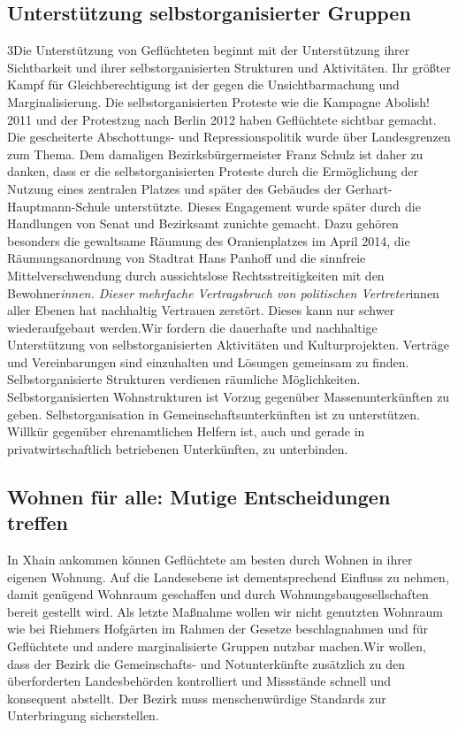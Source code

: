 \documentclass[a4paper,10pt]{article}
\begin{document}
\subsection*{\ttfamily Unterstützung selbstorganisierter
Gruppen}\label{unterstuxfctzung-selbstorganisierter-gruppen}

3Die Unterstützung von Geflüchteten beginnt mit der Unterstützung ihrer
Sichtbarkeit und ihrer selbstorganisierten Strukturen und Aktivitäten.
Ihr größter Kampf für Gleichberechtigung ist der gegen die
Unsichtbarmachung und Marginalisierung. Die selbstorganisierten Proteste
wie die Kampagne Abolish! 2011 und der Protestzug nach Berlin 2012 haben
Geflüchtete sichtbar gemacht. Die gescheiterte Abschottungs- und
Repressionspolitik wurde über Landesgrenzen zum Thema. Dem damaligen
Bezirksbürgermeister Franz Schulz ist daher zu danken, dass er die
selbstorganisierten Proteste durch die Ermöglichung der Nutzung eines
zentralen Platzes und später des Gebäudes der Gerhart-Hauptmann-Schule
unterstützte. Dieses Engagement wurde später durch die Handlungen von
Senat und Bezirksamt zunichte gemacht. Dazu gehören besonders die
gewaltsame Räumung des Oranienplatzes im April 2014, die
Räumungsanordnung von Stadtrat Hans Panhoff und die sinnfreie
Mittelverschwendung durch aussichtslose Rechtsstreitigkeiten mit den
Bewohner\emph{innen. Dieser mehrfache Vertragsbruch von politischen
Vertreter}innen aller Ebenen hat nachhaltig Vertrauen zerstört. Dieses
kann nur schwer wiederaufgebaut werden.Wir fordern die dauerhafte und
nachhaltige Unterstützung von selbstorganisierten Aktivitäten und
Kulturprojekten. Verträge und Vereinbarungen sind einzuhalten und
Lösungen gemeinsam zu finden. Selbstorganisierte Strukturen verdienen
räumliche Möglichkeiten. Selbstorganisierten Wohnstrukturen ist Vorzug
gegenüber Massenunterkünften zu geben. Selbstorganisation in
Gemeinschaftsunterkünften ist zu unterstützen. Willkür gegenüber
ehrenamtlichen Helfern ist, auch und gerade in privatwirtschaftlich
betriebenen Unterkünften, zu unterbinden.

\subsection*{\ttfamily Wohnen für alle: Mutige Entscheidungen
treffen}\label{wohnen-fuxfcr-alle-mutige-entscheidungen-treffen}

In Xhain ankommen können Geflüchtete am besten durch Wohnen in ihrer
eigenen Wohnung. Auf die Landesebene ist dementsprechend Einfluss zu
nehmen, damit genügend Wohnraum geschaffen und durch
Wohnungsbaugesellschaften bereit gestellt wird. Als letzte Maßnahme
wollen wir nicht genutzten Wohnraum wie bei Riehmers Hofgärten im Rahmen
der Gesetze beschlagnahmen und für Geflüchtete und andere
marginalisierte Gruppen nutzbar machen.Wir wollen, dass der Bezirk die
Gemeinschafts- und Notunterkünfte zusätzlich zu den überforderten
Landesbehörden kontrolliert und Missstände schnell und konsequent
abstellt. Der Bezirk muss menschenwürdige Standards zur Unterbringung
sicherstellen.
\end{document}
